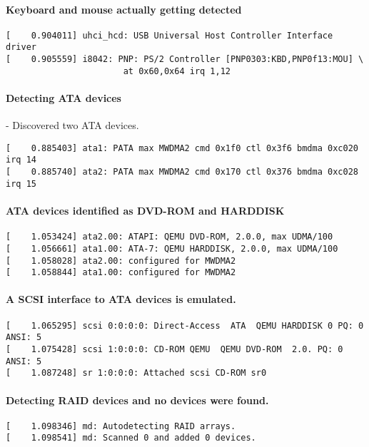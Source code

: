 \documentclass[10pt] {article}
\begin{document}
\paragraph{Keyboard and mouse actually getting detected}

\begin{verbatim}
[    0.904011] uhci_hcd: USB Universal Host Controller Interface driver
[    0.905559] i8042: PNP: PS/2 Controller [PNP0303:KBD,PNP0f13:MOU] \
                       at 0x60,0x64 irq 1,12
\end{verbatim}

\paragraph{Detecting ATA devices}  - Discovered two ATA devices.
\begin{verbatim}
[    0.885403] ata1: PATA max MWDMA2 cmd 0x1f0 ctl 0x3f6 bmdma 0xc020 irq 14
[    0.885740] ata2: PATA max MWDMA2 cmd 0x170 ctl 0x376 bmdma 0xc028 irq 15
\end{verbatim}

\paragraph{ATA devices identified as DVD-ROM and HARDDISK}
\begin{verbatim}
[    1.053424] ata2.00: ATAPI: QEMU DVD-ROM, 2.0.0, max UDMA/100
[    1.056661] ata1.00: ATA-7: QEMU HARDDISK, 2.0.0, max UDMA/100
[    1.058028] ata2.00: configured for MWDMA2
[    1.058844] ata1.00: configured for MWDMA2
\end{verbatim}

\paragraph{A SCSI interface to ATA devices is emulated.}
\begin{verbatim}
[    1.065295] scsi 0:0:0:0: Direct-Access  ATA  QEMU HARDDISK 0 PQ: 0 ANSI: 5
[    1.075428] scsi 1:0:0:0: CD-ROM QEMU  QEMU DVD-ROM  2.0. PQ: 0 ANSI: 5
[    1.087248] sr 1:0:0:0: Attached scsi CD-ROM sr0
\end{verbatim}

\paragraph{Detecting RAID devices and no devices were found.}
\begin{verbatim}
[    1.098346] md: Autodetecting RAID arrays.
[    1.098541] md: Scanned 0 and added 0 devices.
\end{verbatim}
\end{document}
